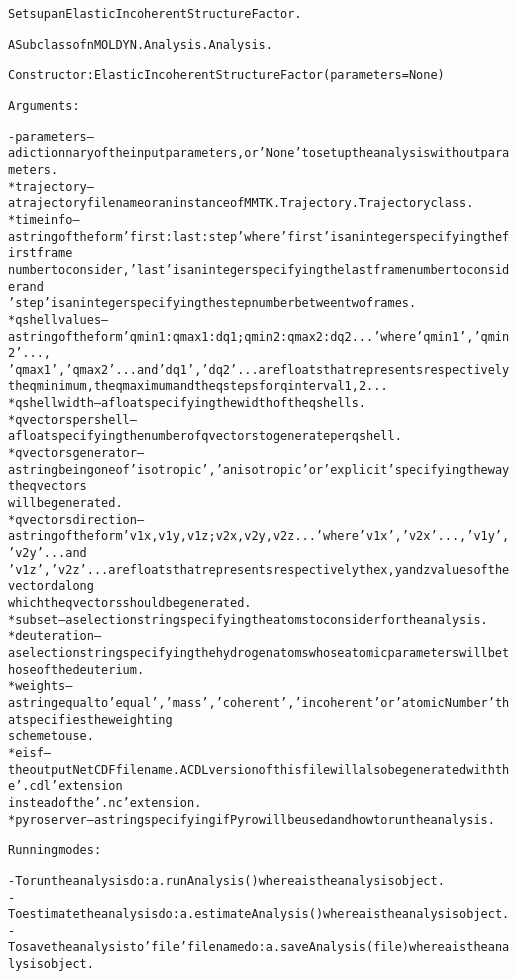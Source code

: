 \begin{alltt}
Sets up an Elastic Incoherent Structure Factor.

A Subclass of nMOLDYN.Analysis.Analysis. 

Constructor: ElasticIncoherentStructureFactor({\textbar}parameters{\textbar} = None)

Arguments:

    - {\textbar}parameters{\textbar} -- a dictionnary of the input parameters, or 'None' to set up the analysis without parameters.
        * trajectory        -- a trajectory file name or an instance of MMTK.Trajectory.Trajectory class.
        * timeinfo          -- a string of the form 'first:last:step' where 'first' is an integer specifying the first frame 
                               number to consider, 'last' is an integer specifying the last frame number to consider and 
                               'step' is an integer specifying the step number between two frames.
        * qshellvalues      -- a string of the form 'qmin1:qmax1:dq1;qmin2:qmax2:dq2...' where 'qmin1', 'qmin2' ... , 
                               'qmax1', 'qmax2' ... and 'dq1', 'dq2' ... are floats that represents respectively 
                               the q minimum, the q maximum and the q steps for q interval 1, 2 ...
        * qshellwidth       -- a float specifying the width of the q shells.
        * qvectorspershell  -- a float specifying the number of q vectors to generate per q shell.
        * qvectorsgenerator -- a string being one of 'isotropic', 'anisotropic' or 'explicit' specifying the way the q vectors
                               will be generated.
        * qvectorsdirection -- a string of the form 'v1x,v1y,v1z;v2x,v2y,v2z...' where 'v1x', 'v2x' ..., 'v1y', 'v2y' ... and
                               'v1z', 'v2z' ... are floats that represents respectively the x, y and z values of the vectord along 
                               which the q vectors should be generated.
        * subset            -- a selection string specifying the atoms to consider for the analysis.
        * deuteration       -- a selection string specifying the hydrogen atoms whose atomic parameters will be those of the deuterium.
        * weights           -- a string equal to 'equal', 'mass', 'coherent' , 'incoherent' or 'atomicNumber' that specifies the weighting
                               scheme to use.
        * eisf              -- the output NetCDF file name. A CDL version of this file will also be generated with the '.cdl' extension
                               instead of the '.nc' extension.
        * pyroserver        -- a string specifying if Pyro will be used and how to run the analysis.
    
Running modes:

    - To run the analysis do: a.runAnalysis() where a is the analysis object.
    - To estimate the analysis do: a.estimateAnalysis() where a is the analysis object.
    - To save the analysis to 'file' file name do: a.saveAnalysis(file) where a is the analysis object.
    
\end{alltt}


